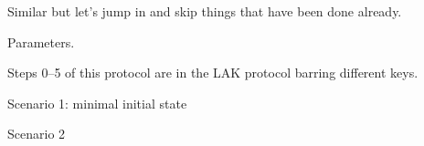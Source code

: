 Similar but let's jump in and skip things that have been done already.

Parameters.

Steps 0--5 of this protocol are in the LAK protocol barring different keys.

Scenario 1: minimal initial state

Scenario 2







